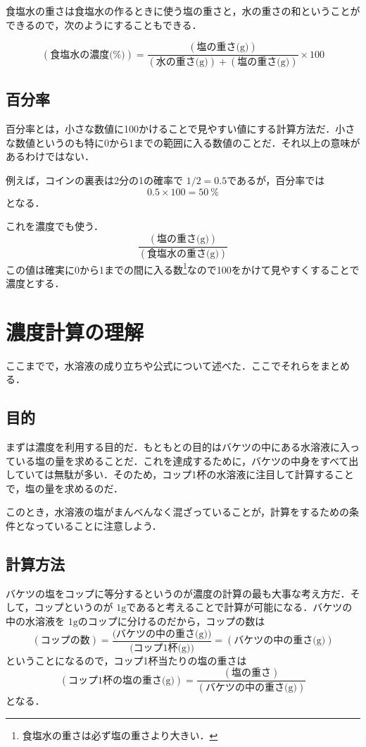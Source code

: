\documentclass[dvipdfmx]{jsarticle}
\begin{document}
    食塩水の重さは食塩水の作るときに使う塩の重さと，水の重さの和ということができるので，次のようにすることもできる．

    \begin{equation}
        (\text{食塩水の濃度(\%)}) = \frac{(\text{塩の重さ(g)})}{(\text{水の重さ(g)})+(\text{塩の重さ(g)})}\times 100
    \end{equation}


    \subsection{百分率}
    百分率とは，小さな数値に100かけることで見やすい値にする計算方法だ．小さな数値というのも特に0から1までの範囲に入る数値のことだ．それ以上の意味があるわけではない．

    例えば，コインの裏表は2分の1の確率で \(1/2=0.5\)であるが，百分率では
    \[
    0.5\times 100 =50\ \%
    \]
    となる．

    これを濃度でも使う．
    \[
    \frac{(\text{塩の重さ(g)})}{(\text{食塩水の重さ(g)})}
    \]
    この値は確実に0から1までの間に入る数\footnote{食塩水の重さは必ず塩の重さより大きい．}なので100をかけて見やすくすることで濃度とする．

    \section{濃度計算の理解}
    ここまでで，水溶液の成り立ちや公式について述べた．ここでそれらをまとめる．
    \subsection{目的}
    まずは濃度を利用する目的だ．もともとの目的はバケツの中にある水溶液に入っている塩の量を求めることだ．これを達成するために，バケツの中身をすべて出していては無駄が多い．そのため，コップ1杯の水溶液に注目して計算することで，塩の量を求めるのだ．

    このとき，水溶液の塩がまんべんなく混ざっていることが，計算をするための条件となっていることに注意しよう．

    \subsection{計算方法}
    バケツの塩をコップに等分するというのが濃度の計算の最も大事な考え方だ．そして，コップというのが \(1\mathrm{g}\)であると考えることで計算が可能になる．バケツの中の水溶液を \(1\mathrm{g}\)のコップに分けるのだから，コップの数は
    \[
       (\text{コップの数})= \frac{\text{(バケツの中の重さ(g))}}{\text{(コップ1杯(g))}}=(\text{バケツの中の重さ(g)})
    \]
    ということになるので，コップ1杯当たりの塩の重さは
    \[
        (\text{コップ1杯の塩の重さ(g)})= \frac{(\text{塩の重さ})}{(\text{バケツの中の重さ(g)})}
    \]
    となる．
\end{document}
